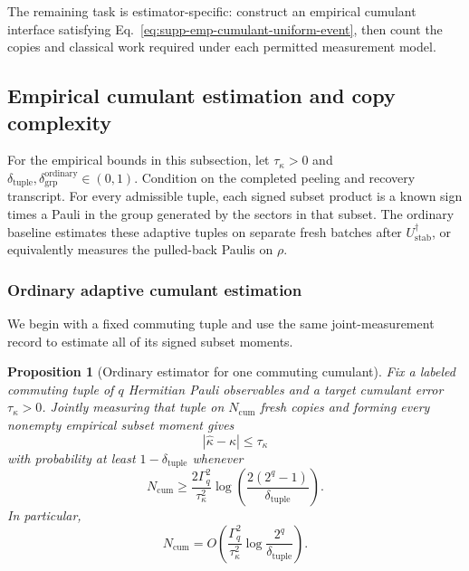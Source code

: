 \documentclass[
  aps,
  prx,
  reprint,
  superscriptaddress,
  amsmath,
  amssymb,
  nofootinbib,
  longbibliography
]{revtex4-2}
\newtheorem{proposition}[theorem]{Proposition}
\begin{document}
The remaining task is estimator-specific: construct an empirical cumulant
interface satisfying Eq.~\eqref{eq:supp-emp-cumulant-uniform-event}, then
count the copies and classical work required under each permitted measurement
model.

\subsection{Empirical cumulant estimation and copy complexity}

For the empirical bounds in this subsection, let $\tau_\kappa>0$ and
$\delta_{\mathrm{tuple}},
\delta_{\mathrm{grp}}^{\mathrm{ordinary}}\in(0,1)$.
Condition on the completed peeling and recovery transcript.  For every
admissible tuple, each signed subset product is a known sign times a Pauli
in the group generated by the sectors in that subset.  The ordinary
baseline estimates these adaptive tuples on separate fresh batches after
$U_{\mathrm{stab}}^\dagger$, or equivalently measures the pulled-back
Paulis on $\rho$.

\subsubsection{Ordinary adaptive cumulant estimation}

We begin with a fixed commuting tuple and use the same joint-measurement
record to estimate all of its signed subset moments.

\begin{proposition}[Ordinary estimator for one commuting cumulant]
\label{prop:supp-commuting-cumulant-sample-count}
Fix a labeled commuting tuple of $q$ Hermitian Pauli observables and a target
cumulant error $\tau_\kappa>0$.  Jointly measuring that tuple on
$N_{\mathrm{cum}}$ fresh copies and forming every nonempty empirical subset
moment gives
\begin{equation}
|\widehat\kappa-\kappa|\le\tau_\kappa
\end{equation}
with probability at least $1-\delta_{\mathrm{tuple}}$ whenever
\begin{equation}
N_{\mathrm{cum}}
\ge
\frac{2\Gamma_q^2}{\tau_\kappa^2}
\log\!\left(
\frac{2(2^q-1)}{\delta_{\mathrm{tuple}}}
\right).
\label{eq:supp-fixed-tuple-ordinary-copies}
\end{equation}
In particular,
\begin{equation}
N_{\mathrm{cum}}
=
O\!\left(
\frac{\Gamma_q^2}{\tau_\kappa^2}
\log\frac{2^q}{\delta_{\mathrm{tuple}}}
\right).
\end{equation}
\end{proposition}
\end{document}
